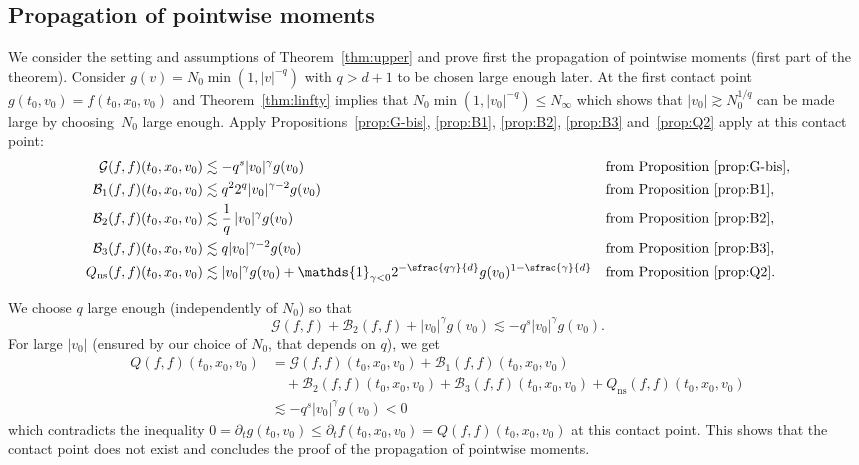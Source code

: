 \documentclass[JEP,XML,SOM,Unicode,NoFloatCountersInSection]{cedram}
\newcommand{\ns}{\mathrm{ns}}
\theoremstyle{plain}
\theoremstyle{definition}
\numberwithin{equation}{section}
\newcommand{\one}{\mathds{1}}
\newcommand{\Ao}{N_0}
\newcommand{\Ai}{N_\infty}
\begin{document}
\subsection{Propagation of pointwise moments}
\label{s:propag}

We consider the setting and assumptions of Theorem~\ref{thm:upper} and
prove first the propagation of pointwise moments (first part of the
theorem). Consider $g(v) = \Ao \min\left(1,|v|^{-q} \right)$ with
$q >d+1$ to be chosen large enough later. At the first contact point
$g(t_0,v_0)=f(t_0,x_0,v_0)$ and Theorem~\ref{thm:linfty} implies that
$\Ao \min(1,|v_0|^{-q}) \leq \Ai$ which shows that
$|v_0| \gtrsim N_0^{1/q}$ can be made large by choosing~$N_0$ large
enough. Apply Propositions~\ref{prop:G-bis}, \ref{prop:B1},
\ref{prop:B2}, \ref{prop:B3} and~\ref{prop:Q2} apply at this contact
point:
\begin{align*}
\mathcal G(f,f)(t_0,x_0,v_0) &\lesssim - q^s |v_0|^{\gamma} g(v_0) && \text{from Proposition } \ref{prop:G-bis},\\
\mathcal B_1 (f,f)(t_0,x_0,v_0) &\lesssim q^2 2^q |v_0|^{\gamma-2} g(v_0) && \text{from Proposition } \ref{prop:B1}, \\
\mathcal B_2 (f,f)(t_0,x_0,v_0) &\lesssim \frac 1 q \,|v_0|^\gamma g(v_0) && \text{from Proposition } \ref{prop:B2},\\
\mathcal B_3 (f,f)(t_0,x_0,v_0) &\lesssim q |v_0|^{\gamma-2} g(v_0) && \text{from Proposition } \ref{prop:B3}, \\
Q_{\ns}(f,f)(t_0,x_0,v_0) &\lesssim |v_0|^{\gamma} g(v_0) +
\one_{\gamma<0} 2^{-\sfrac{q\gamma}{d}}
g(v_0)^{1-\sfrac{\gamma}{d}} && \text{from Proposition } \ref{prop:Q2}.
\end{align*}

We choose $q$ large enough (independently of $N_0$) so that
\[
\mathcal G(f,f) + \mathcal B_2(f,f) + |v_0|^\gamma g(v_0) \lesssim - q^s |v_0|^\gamma g(v_0).
\]
For large $|v_0|$ (ensured by our choice of $N_0$, that depends on $q$), we get
\begin{align*}
Q(f,f)(t_0,x_0,v_0) &= \mathcal G(f,f)(t_0,x_0,v_0) + \mathcal B_1 (f,f)(t_0,x_0,v_0)
\\
& \quad +\mathcal B_2 (f,f)(t_0,x_0,v_0) + \mathcal B_3 (f,f)(t_0,x_0,v_0) +
Q_{\ns}(f,f)(t_0,x_0,v_0) \\
&\lesssim - q^s |v_0|^{\gamma} g(v_0) <0
\end{align*}
which contradicts the inequality
$0= \partial_t g(t_0,v_0) \le \partial_t f(t_0,x_0,v_0) =
Q(f,f)(t_0,x_0,v_0)$ at this contact point. This shows that the
contact point does not exist and concludes the proof of the
propagation of pointwise moments.
\end{document}
